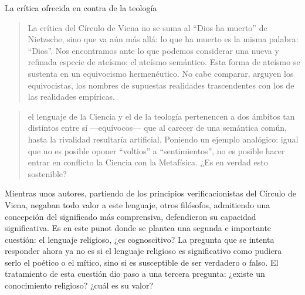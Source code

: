 La crítica ofrecida en contra de la teología
\blockquote[{\cite[155]{dominguez2009at}}]{La crítica del Círculo de Viena no se
  suma al ``Dios ha muerto'' de Nietzsche, sino que va aún más allá: lo que ha
  muerto es la misma palabra: ``Dios''. Nos encontramos ante lo que podemos
  considerar una nueva y refinada especie de ateísmo: el ateísmo semántico. Esta
  forma de ateísmo se sustenta en un equivocismo hermenéutico. No cabe comparar,
  arguyen los equivocistas, los nombres de supuestas realidades trascendentes
  con los de las realidades empíricas.}

\blockquote[{\cite[156]{dominguez2009at}}]{el lenguaje de la Ciencia y el de la
  teología pertenencen a dos ámbitos tan distintos entre sí ---equívocos--- que
  al carecer de una semántica común, hasta la rivalidad resultaría artificial.
  Poniendo un ejemplo analógico: igual que no es posible oponer ``voltios'' a
  ``sentimientos'', no es posible hacer entrar en conflicto la Ciencia con la
  Metafísica. ¿Es en verdad esto sostenible?}

Mientras unos autores, partiendo de los principios verificacionistas del Círculo
de Viena, negaban todo valor a este lenguaje, otros filósofos, admitiendo una
concepción del significado más comprensiva, defendieron su capacidad
significativa. Es en este punot donde se plantea una segunda e importante
cuestión: el lenguaje religioso, ¿es cognoscitivo? La pregunta que se intenta
responder ahora ya no es si el lenguaje religioso es significativo como pudiera
serlo el poético o el mítico, sino si es susceptible de ser verdadero o falso.
El tratamiento de esta cuestión dio paso a una tercera pregunta: ¿existe un
conocimiento religioso? ¿cuál es su valor?
